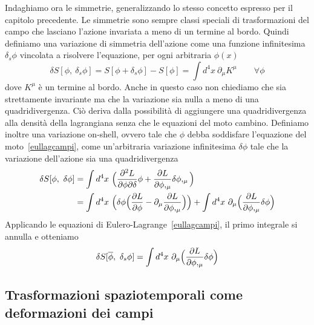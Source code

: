     Indaghiamo ora le simmetrie, generalizzando lo stesso concetto espresso per il capitolo precedente. Le simmetrie sono sempre classi speciali di trasformazioni del campo che lasciano l'azione invariata a meno di un termine al bordo. Quindi definiamo una variazione di simmetria dell'azione come una funzione infinitesima $\delta_s \phi$ vincolata a risolvere l'equazione, per ogni arbitraria $\phi(x)$
    \begin{equation} \label{invazionecampi}
        \delta S[\phi, ~\delta_s \phi] = S[\phi + \delta_s \phi] - S[\phi] = \int d^4 x ~ \partial_\mu K^\mu \qquad \forall \phi
    \end{equation}  
    dove $K^\mu$ è un termine al bordo. Anche in questo caso non chiediamo che sia strettamente invariante ma che la variazione sia nulla a meno di una quadridivergenza. Ciò deriva dalla possibilità di aggiungere una quadridivergenza alla densità della lagrangiana senza che le equazioni del moto cambino. Definiamo inoltre una variazione on-shell, ovvero tale che $\phi$ debba soddisfare l'equazione del moto~\eqref{eullagcampi}, come un'arbitraria variazione infinitesima $\delta \phi$ tale che la variazione dell'azione sia una quadridivergenza
    \begin{equation*}
    \begin{aligned}
        \delta S[\phi, ~\delta \phi] & = \int d^4 x ~ \Big(\frac{\partial^2 L}{\partial\phi \partial\delta} \phi + \frac{\partial L}{\partial\phi,_\mu} \delta \phi,_\mu \Big) \\ & = \int d^4 x ~ \Big ( \delta \phi \Big (\frac{\partial L}{\partial\phi} - \partial_\mu \frac{\partial L}{\partial\phi,_\mu} \Big ) \Big) + \int d^4 x ~ \partial_\mu \Big ( \frac{\partial L}{\partial\phi,_\mu}  \delta \phi \Big)
    \end{aligned}
    \end{equation*}
    Applicando le equazioni di Eulero-Lagrange~\eqref{eullagcampi}, il primo integrale si annulla e otteniamo 
    \begin{equation} \label{invonshellcampi}
        \delta S[\overline \phi, ~\delta_s \phi] = \int d^4 x ~ \partial_\mu \Big ( \frac{\partial L}{\partial\phi,_\mu}  \delta \phi \Big)
    \end{equation}

\subsection{Trasformazioni spaziotemporali come deformazioni dei campi}

